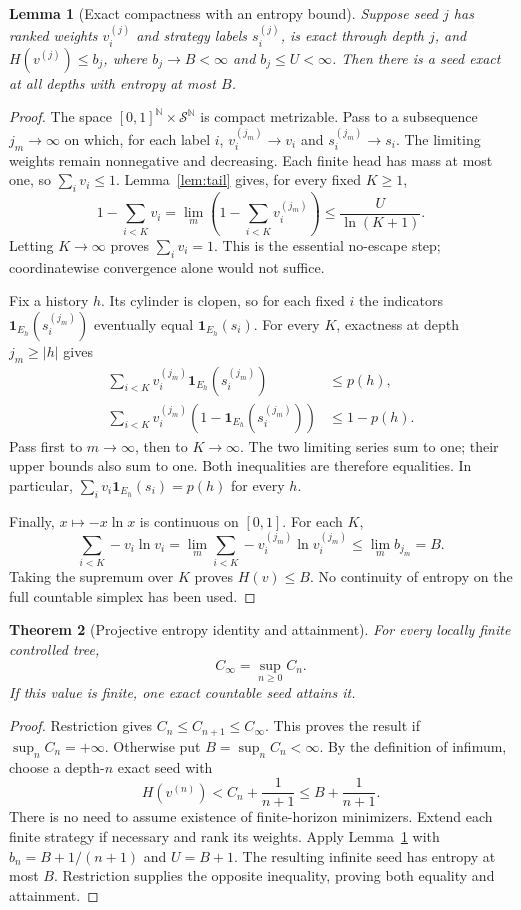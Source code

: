 \documentclass[11pt]{article}
\newtheorem{theorem}{Theorem}
\newtheorem{lemma}[theorem]{Lemma}
\newcommand{\cS}{\mathcal S}
\begin{document}
\begin{lemma}[Exact compactness with an entropy bound]\label{lem:compact}
Suppose seed $j$ has ranked weights $v_i^{(j)}$ and strategy labels
$s_i^{(j)}$, is exact through depth $j$, and
$H(v^{(j)})\le b_j$, where $b_j\to B<\infty$ and $b_j\le U<\infty$.
Then there is a seed exact at all depths with entropy at most $B$.
\end{lemma}
\begin{proof}
The space $[0,1]^{\mathbb N}\times\cS^{\mathbb N}$ is compact metrizable.
Pass to a subsequence $j_m\to\infty$ on which, for each label $i$,
$v_i^{(j_m)}\to v_i$ and $s_i^{(j_m)}\to s_i$. The limiting weights
remain nonnegative and decreasing. Each finite head has mass at most one,
so $\sum_iv_i\le1$. Lemma~\ref{lem:tail} gives, for every fixed $K\ge1$,
\[
 1-\sum_{i<K}v_i
   =\lim_m\left(1-\sum_{i<K}v_i^{(j_m)}\right)
   \le\frac{U}{\ln(K+1)}.
\]
Letting $K\to\infty$ proves $\sum_iv_i=1$. This is the essential
no-escape step; coordinatewise convergence alone would not suffice.

Fix a history $h$. Its cylinder is clopen, so for each fixed $i$ the
indicators $\mathbf1_{E_h}(s_i^{(j_m)})$ eventually equal
$\mathbf1_{E_h}(s_i)$. For every $K$, exactness at depth $j_m\ge|h|$ gives
\begin{align*}
 \sum_{i<K}v_i^{(j_m)}\mathbf1_{E_h}(s_i^{(j_m)})&\le p(h),\\
 \sum_{i<K}v_i^{(j_m)}(1-\mathbf1_{E_h}(s_i^{(j_m)}))&\le1-p(h).
\end{align*}
Pass first to $m\to\infty$, then to $K\to\infty$. The two limiting
series sum to one; their upper bounds also sum to one. Both inequalities
are therefore equalities. In particular,
$\sum_i v_i\mathbf1_{E_h}(s_i)=p(h)$ for every $h$.

Finally, $x\mapsto-x\ln x$ is continuous on $[0,1]$. For each $K$,
\[
 \sum_{i<K}-v_i\ln v_i
 =\lim_m\sum_{i<K}-v_i^{(j_m)}\ln v_i^{(j_m)}
 \le\lim_m b_{j_m}=B.
\]
Taking the supremum over $K$ proves $H(v)\le B$. No continuity of entropy
on the full countable simplex has been used.
\end{proof}

\begin{theorem}[Projective entropy identity and attainment]\label{th:entropy}
For every locally finite controlled tree,
\[
 \boxed{C_\infty=\sup_{n\ge0}C_n.}
\]
If this value is finite, one exact countable seed attains it.
\end{theorem}
\begin{proof}
Restriction gives $C_n\le C_{n+1}\le C_\infty$. This proves the result
if $\sup_nC_n=+\infty$. Otherwise put $B=\sup_nC_n<\infty$.
By the definition of infimum, choose a depth-$n$ exact seed with
\[
 H(v^{(n)})<C_n+\frac1{n+1}\le B+\frac1{n+1}.
\]
There is no need to assume existence of finite-horizon minimizers.
Extend each finite strategy if necessary and rank its weights.
Apply Lemma~\ref{lem:compact} with $b_n=B+1/(n+1)$ and $U=B+1$.
The resulting infinite seed has entropy at most $B$. Restriction supplies
the opposite inequality, proving both equality and attainment.
\end{proof}
\end{document}
